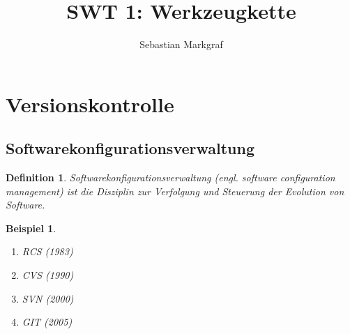 \documentclass[a4paper]{article}
\title{SWT 1: Werkzeugkette}
\author{Sebastian Markgraf}
\theoremstyle{break}
\newtheorem{defi}{Definition}[section]
\newtheorem{ex}{Beispiel}[section]
\begin{document}
    \maketitle
    \newpage

    \section{Versionskontrolle}
    \subsection{Softwarekonfigurationsverwaltung}
    \begin{defi}
      Softwarekonfigurationsverwaltung (engl. software configuration management) ist die Disziplin zur Verfolgung und Steuerung der Evolution von Software.
    \end{defi}

    \begin{ex}
      \begin {enumerate}
        \item RCS (1983)
        \item CVS (1990)
        \item SVN (2000)
        \item GIT (2005)
      \end {enumerate}
    \end{ex}
    
     
\end{document}
